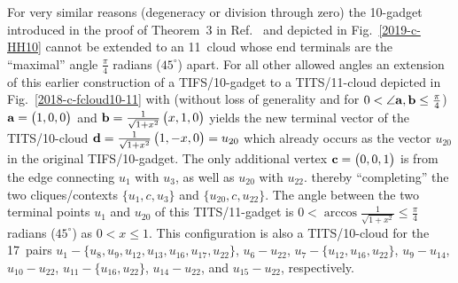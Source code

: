 \documentclass[%
  reprint,
  twocolumn,
 showpacs,
 showkeys,
 preprintnumbers,
 amsmath,amssymb,
 aps,
  prl,
  longbibliography,
 ]{revtex4-1}
\begin{document}
For very similar reasons (degeneracy or division through zero)
the 10-gadget introduced in the proof of Theorem~3 in Ref.~\cite{Ramanathan-18}
and depicted in
Fig.~\ref{2019-c-HH10}
cannot be extended to an 11~cloud whose end terminals
are the ``maximal'' angle $\frac{\pi}{4}$ radians ($45^\circ$) apart.
For all other allowed angles an extension of this earlier construction
of a TIFS/10-gadget to a TITS/11-cloud
depicted in Fig.~\ref{2018-c-fcloud10-11}
with (without loss of generality
and for $0< \angle {\bf a},{\bf b} \le \frac{\pi}{4}$)
 ${\bf a} =\begin{pmatrix} 1,0,0 \end{pmatrix}$
and
${\bf b} =\frac{1}{\sqrt{1+x^2}}\begin{pmatrix} x,1,0 \end{pmatrix}$
 yields
the new terminal vector of the TITS/10-cloud
${\bf d} =\frac{1}{\sqrt{1+x^2}}\begin{pmatrix} 1,-x,0 \end{pmatrix} =  u_{20}$
which already occurs as the vector  $ u_{20}$
in the original TIFS/10-gadget.
The only additional vertex ${\bf c} =\begin{pmatrix} 0,0,1 \end{pmatrix}$
is from the edge connecting $u_{1}$ with $u_{3}$, as well as $u_{20}$ with $u_{22}$.
thereby ``completing'' the two cliques/contexts $\{u_1,c,u_3\}$ and  $\{u_{20},c,u_{22}\}$.
The angle between the two terminal points $u_1$ and $u_{20}$
of this TITS/11-gadget is $0 < \arccos \frac{1}{\sqrt{1+x^2}}\le \frac{\pi}{4}$ radians ($45^\circ$) as $0<x\le 1$.
This configuration is also a
TITS/10-cloud for the 17~pairs
$u_1-\{u_8,u_9,u_{12},u_{13},u_{16},u_{17},u_{22}\}$,
$u_{6}-u_{22}$,
$u_{7}-\{u_{12},u_{16},u_{22}\}$,
$u_{9}-u_{14}$,
$u_{10}-u_{22}$,
$u_{11}-\{ u_{16}, u_{22}\}$,
$u_{14}-u_{22}$, and
$u_{15}-u_{22}$, respectively.
\end{document}
